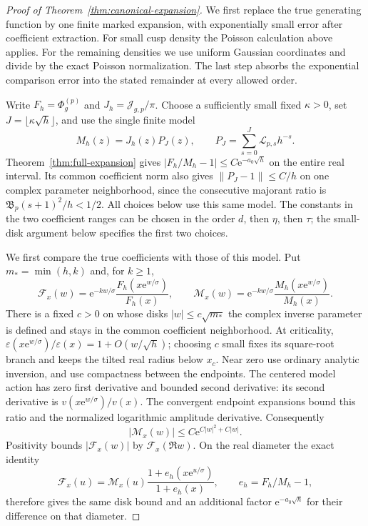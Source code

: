 \begin{proof}[Proof of Theorem~\ref{thm:canonical-expansion}]
We first replace the true generating function by one finite marked
expansion, with exponentially small error after coefficient extraction.
For small cusp density the Poisson calculation above applies. For the
remaining densities we use uniform Gaussian coordinates and divide by
the exact Poisson normalization. The last step absorbs the exponential
comparison error into the stated remainder at every allowed order.

Write $F_h=\Phi_g^{(p)}$ and $J_h=\mathcal J_{g,p}/\pi$.
Choose a sufficiently small fixed $\kappa>0$, set
$J=\lfloor\kappa\sqrt h\rfloor$, and use the single finite model
\[
 M_h(z)=J_h(z)P_J(z),\qquad
 P_J=\sum_{s=0}^J\mathcal L_{p,s}h^{-s}.
\]
Theorem~\ref{thm:full-expansion} gives
$|F_h/M_h-1|\le C\mathrm{e}^{-a_0\sqrt h}$ on the entire real interval.
Its common coefficient norm also gives $\|P_J-1\|\le C/h$ on one
complex parameter neighborhood, since the consecutive majorant ratio
is $\mathfrak B_p(s+1)^2/h<1/2$. All choices below use this same model.
The constants in the two coefficient ranges can be chosen in the order
$d$, then $\eta$, then $\tau$; the small-disk argument below specifies
the first two choices.

We first compare the true coefficients with those of this model. Put
$m_* =\min(h,k)$ and, for $k\ge1$,
\[
 \mathscr F_x(w)=\mathrm{e}^{-kw/\sigma}
       \frac{F_h(x\mathrm{e}^{w/\sigma})}{F_h(x)},\qquad
 \mathscr M_x(w)=\mathrm{e}^{-kw/\sigma}
       \frac{M_h(x\mathrm{e}^{w/\sigma})}{M_h(x)}.
\]
There is a fixed $c>0$ on whose disks $|w|\le c\sqrt{m_*}$
the complex inverse parameter is defined and stays in the common
coefficient neighborhood. At criticality,
$\varepsilon(x\mathrm{e}^{w/\sigma})/\varepsilon(x)=1+O(w/\sqrt h)$;
choosing $c$ small fixes its square-root branch and keeps the tilted
real radius below $x_c$. Near zero use ordinary analytic inversion,
and use compactness between the endpoints.
The centered model action has zero first derivative and bounded second
derivative: its second derivative is
$v(x\mathrm{e}^{w/\sigma})/v(x)$. The convergent endpoint expansions bound
this ratio and the normalized logarithmic amplitude derivative.
Consequently
\[
 |\mathscr M_x(w)|\le C\mathrm{e}^{C|w|^2+C|w|}.
\]
Positivity bounds $|\mathscr F_x(w)|$ by $\mathscr F_x(\Re w)$.
On the real diameter the exact identity
\[
 \mathscr F_x(u)=\mathscr M_x(u)
 \frac{1+e_h(x\mathrm{e}^{u/\sigma})}{1+e_h(x)},\qquad
 e_h=F_h/M_h-1,
\]
therefore gives the same disk bound and an additional factor
$\mathrm{e}^{-a_0\sqrt h}$ for their difference on that diameter.


\end{proof}

